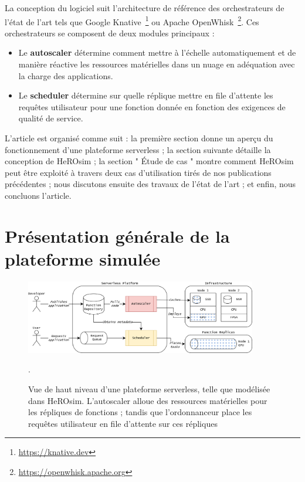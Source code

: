 La conception du logiciel suit l'architecture de référence des orchestrateurs de l'état de l'art tels que Google Knative~\footnote{\href{https://knative.dev}{https://knative.dev}} ou Apache OpenWhisk~\footnote{\href{https://openwhisk.apache.org}{https://openwhisk.apache.org}}. Ces orchestrateurs se composent de deux modules principaux :

\begin{itemize}
    \item Le \textbf{autoscaler} détermine comment mettre à l'échelle automatiquement et de manière réactive les ressources matérielles dans un nuage en adéquation avec la charge des applications.
    \item Le \textbf{scheduler} détermine sur quelle réplique mettre en file d'attente les requêtes utilisateur pour une fonction donnée en fonction des exigences de qualité de service.
\end{itemize}

L'article est organisé comme suit : la première section donne un aperçu du fonctionnement d'une plateforme serverless ; la section suivante détaille la conception de HeROsim ; la section " Étude de cas " montre comment HeROsim peut être exploité à travers deux cas d'utilisation tirés de nos publications précédentes ; nous discutons ensuite des travaux de l'état de l'art ; et enfin, nous concluons l'article.

\section{Présentation générale de la plateforme simulée}
\label{section:herosim-overview}

\begin{figure}[t]
    \centering
    \includegraphics[width=0.9\textwidth]{7_Chapitre5/figures/platform.png}
    \caption{Vue de haut niveau d'une plateforme serverless, telle que modélisée dans HeROsim. L'autoscaler alloue des ressources matérielles pour les répliques de fonctions ; tandis que l'ordonnanceur place les requêtes utilisateur en file d'attente sur ces répliques}.
\label{figure:herosim-platform}
\end{figure}

